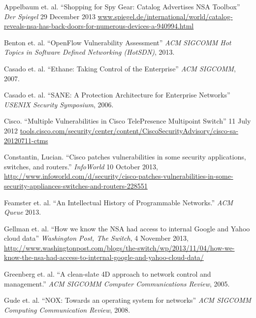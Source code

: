 \small{
\begin{thebibliography}{99}

 Appelbaum et. al. ``Shopping for Spy Gear: Catalog Advertises NSA Toolbox'' \emph{Der Spiegel} 29 December 2013 \url{www.spiegel.de/international/world/catalog-reveals-nsa-has-back-doors-for-numerous-devices-a-940994.html}

 Benton et. al. ``OpenFlow Vulnerability Assessment'' \emph{ACM SIGCOMM Hot Topics in Software Defined Networking (HotSDN)}, 2013. 

 Casado et. al. ``Ethane: Taking Control of the Enterprise'' \emph{ACM SIGCOMM}, 2007.

 Casado et. al. ``SANE: A Protection Architecture for Enterprise Networks'' \emph{USENIX Security Symposium}, 2006.

 Cisco. ``Multiple Vulnerabilities in Cisco TelePresence Multipoint Switch'' 11 July 2012 \url{tools.cisco.com/security/center/content/CiscoSecurityAdvisory/cisco-sa-20120711-ctms}

 Constantin, Lucian. ``Cisco patches vulnerabilities in some security applications, switches, and routers.'' \emph{InfoWorld} 10 October 2013, \url{http://www.infoworld.com/d/security/cisco-patches-vulnerabilities-in-some-security-appliances-switches-and-routers-228551}


 Feamster et. al. ``An Intellectual History of Programmable Networks.'' \emph{ACM Queue} 2013.

 Gellman et. al. ``How we know the NSA had access to internal Google and Yahoo cloud data'' \emph{Washington Post, The Switch}, 4 November 2013, \url{http://www.washingtonpost.com/blogs/the-switch/wp/2013/11/04/how-we-know-the-nsa-had-access-to-internal-google-and-yahoo-cloud-data/}

 Greenberg et. al. ``A clean-slate 4D approach to network control and management.'' \emph{ACM SIGCOMM Computer Communications Review}, 2005.

 Gude et. al. ``NOX: Towards an operating system for networks'' \emph{ACM SIGCOMM Computing Communication Review}, 2008.



\end{thebibliography}}
